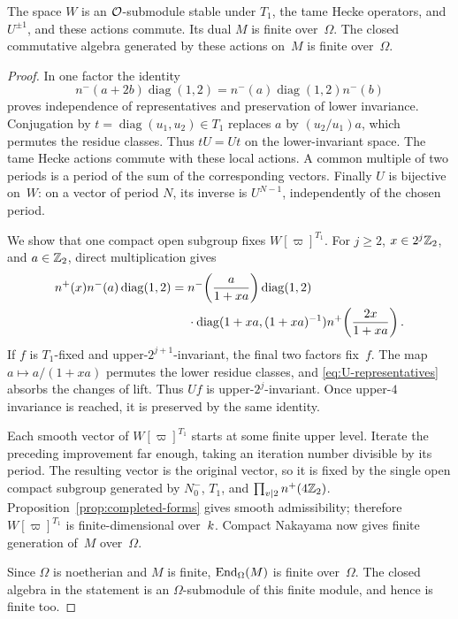 \begin{proposition}
\label{prop:ordinary-weight-finiteness}
The space $W$ is an $\mathcal O$-submodule stable under $T_1$, the tame Hecke
operators, and $U^{\pm1}$, and these actions commute.  Its dual $M$ is
finite over~$\Omega$.  The closed commutative algebra generated by these
actions on~$M$ is finite over~$\Omega$.
\end{proposition}
\begin{proof}
In one factor the identity
\begin{equation}\label{eq:U-representatives}
 n^-(a+2b)\operatorname{diag}(1,2)
 =n^-(a)\operatorname{diag}(1,2)n^-(b)
\end{equation}
proves independence of representatives and preservation of lower
invariance.  Conjugation by $t=\operatorname{diag}(u_1,u_2)\in T_1$
replaces $a$ by $(u_2/u_1)a$, which permutes the residue classes.
Thus $tU=Ut$ on the lower-invariant space.  The tame Hecke actions commute
with these local actions.  A common multiple of two periods is a period
of the sum of the corresponding vectors.  Finally $U$ is bijective
on~$W$: on a vector of period $N$, its inverse is $U^{N-1}$, independently
of the chosen period.

We show that one compact open subgroup fixes $W[\varpi]^{T_1}$.
For $j\ge2$, $x\in2^j\mathbb Z_2$, and $a\in\mathbb Z_2$, direct multiplication
gives
\begin{align}
 n^+(x)n^-(a)\operatorname{diag}(1,2)
 ={}&n^-\!\left(\frac{a}{1+xa}\right)
       \operatorname{diag}(1,2)\notag\\
 &\cdot\operatorname{diag}(1+xa,(1+xa)^{-1})
       n^+\!\left(\frac{2x}{1+xa}\right).
       \label{eq:U-upper-improvement}
\end{align}
If $f$ is $T_1$-fixed and upper-$2^{j+1}$-invariant, the final two
factors fix~$f$.  The map $a\mapsto a/(1+xa)$ permutes the lower
residue classes, and \eqref{eq:U-representatives} absorbs the changes
of lift.  Thus $Uf$ is upper-$2^j$-invariant.  Once upper-$4$ invariance
is reached, it is preserved by the same identity.

Each smooth vector of $W[\varpi]^{T_1}$ starts at some finite upper
level.  Iterate the preceding improvement far enough, taking an
iteration number divisible by its period.  The resulting vector is the
original vector, so it is fixed by the single open compact subgroup
generated by $N_0^-$, $T_1$, and $\prod_{v\mid2}n^+(4\mathbb Z_2)$.
Proposition~\ref{prop:completed-forms} gives smooth admissibility;
therefore $W[\varpi]^{T_1}$ is finite-dimensional over~$k$.
Compact Nakayama now gives finite generation of~$M$ over~$\Omega$.

Since $\Omega$ is noetherian and $M$ is finite, $\operatorname{End}_\Omega(M)$ is
finite over~$\Omega$.  The closed algebra in the statement is an
$\Omega$-submodule of this finite module, and hence is finite too.
\end{proof}

